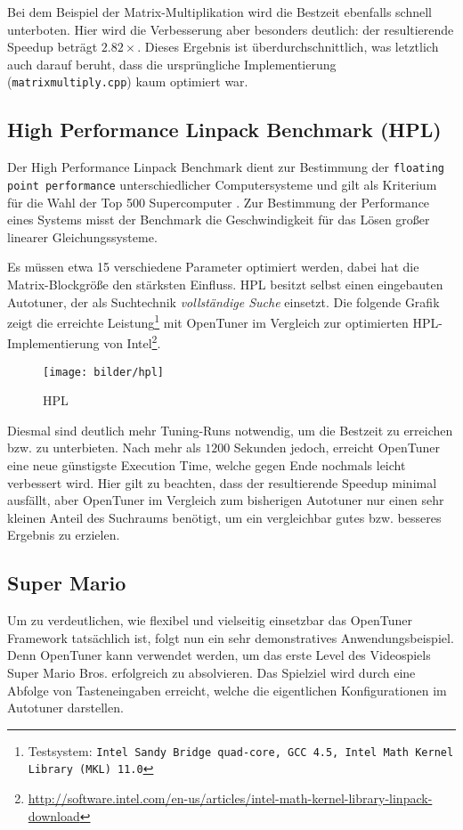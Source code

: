 \documentclass[a4paper,11pt]{scrartcl}
\newcommand{\bzw}{\mbox{bzw.}\xspace}
\begin{document}
Bei dem Beispiel der Matrix-Multiplikation wird die Bestzeit ebenfalls schnell unterboten.
Hier wird die Verbesserung aber besonders deutlich: der resultierende Speedup beträgt
$2.82 \times$. Dieses Ergebnis ist überdurchschnittlich, was letztlich auch darauf beruht,
dass die ursprüngliche Implementierung (\texttt{matrixmultiply.cpp}) kaum optimiert war.

\subsection{High Performance Linpack Benchmark (HPL)}
Der High Performance Linpack Benchmark \cite{hpl} dient zur Bestimmung der 
\texttt{floating point performance} unterschiedlicher Computersysteme und gilt als 
Kriterium für die Wahl der Top 500 Supercomputer \cite{top500}.
Zur Bestimmung der Performance eines Systems misst der Benchmark die Geschwindigkeit 
für das Lösen großer linearer Gleichungssysteme. \newline

Es müssen etwa 15 verschiedene Parameter
optimiert werden, dabei hat die Matrix-Blockgröße den stärksten Einfluss.
HPL besitzt selbst einen eingebauten Autotuner, der als Suchtechnik 
\emph{vollständige Suche} einsetzt. Die folgende Grafik zeigt die erreichte Leistung\footnote{
Testsystem: \texttt{Intel Sandy Bridge quad-core, GCC 4.5, Intel  Math  Kernel  Library  (MKL)  11.0}}
mit OpenTuner im Vergleich zur optimierten HPL-Implementierung von Intel\footnote{\url{http://software.intel.com/en-us/articles/intel-math-kernel-library-linpack-download}}. \newline


\begin{figure}[h]
\begin{center}
\texttt{[image: bilder/hpl]}
\cite[S.~9]{OT-paper} \caption{HPL}
\end{center}
\end{figure}

Diesmal sind deutlich mehr Tuning-Runs notwendig, um die Bestzeit zu erreichen \bzw zu unterbieten.
Nach mehr als $1200$ Sekunden jedoch, erreicht OpenTuner eine neue günstigste Execution Time,
welche gegen Ende nochmals leicht verbessert wird. Hier gilt zu beachten, dass der resultierende
Speedup minimal ausfällt, aber OpenTuner im Vergleich zum bisherigen Autotuner nur einen 
sehr kleinen Anteil des Suchraums benötigt, um ein vergleichbar gutes \bzw besseres Ergebnis 
zu erzielen.

\subsection{Super Mario}
Um zu verdeutlichen, wie flexibel und vielseitig einsetzbar das OpenTuner Framework tatsächlich ist,
folgt nun ein sehr demonstratives Anwendungsbeispiel. Denn OpenTuner kann verwendet werden,
um das erste Level des Videospiels Super Mario Bros. erfolgreich zu absolvieren.
Das Spielziel wird durch eine Abfolge von Tasteneingaben erreicht, welche die eigentlichen
Konfigurationen im Autotuner darstellen. \newline
\end{document}
